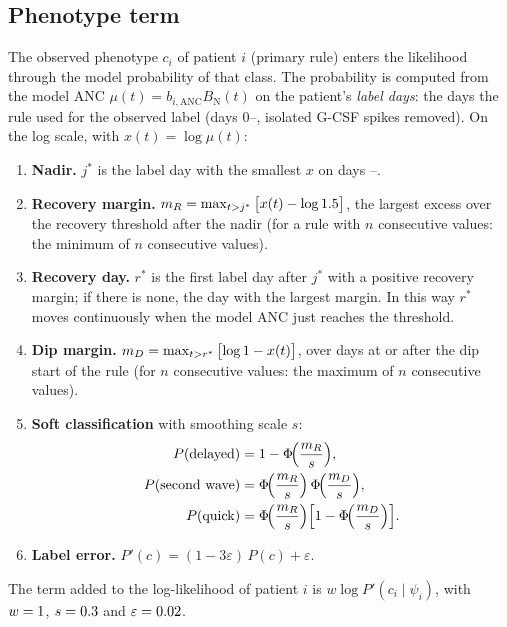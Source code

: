 \documentclass[11pt]{article}
\begin{document}
\subsection{Phenotype term}\label{sec:pheno}
The observed phenotype $c_i$ of patient $i$ (primary rule) enters the likelihood through the model probability of that class. The probability is computed from the model ANC $\mu(t)=b_{i,\mathrm{ANC}}B_{\mathrm{N}}(t)$ on the patient's \emph{label days}: the days the rule used for the observed label (days 0--\valPhWin, isolated G-CSF spikes removed). On the log scale, with $x(t)=\log\mu(t)$:
\begin{enumerate}
\item \textbf{Nadir.} $j^\ast$ is the label day with the smallest $x$ on days \valNadFrom--\valNadTo.
\item \textbf{Recovery margin.} $m_R=\max_{t>j^\ast}\,\bigl[x(t)-\log1.5\bigr]$, the largest excess over the recovery threshold after the nadir (for a rule with $n$ consecutive values: the minimum of $n$ consecutive values).
\item \textbf{Recovery day.} $r^\ast$ is the first label day after $j^\ast$ with a positive recovery margin; if there is none, the day with the largest margin. In this way $r^\ast$ moves continuously when the model ANC just reaches the threshold.
\item \textbf{Dip margin.} $m_D=\max_{t>r^\ast}\,\bigl[\log1-x(t)\bigr]$, over days at or after the dip start of the rule (for $n$ consecutive values: the maximum of $n$ consecutive values).
\item \textbf{Soft classification} with smoothing scale $s$:
\begin{equation}
\begin{aligned}
P(\mathrm{delayed}) &= 1-\Phi\!\Bigl(\frac{m_R}{s}\Bigr),\\
P(\mathrm{second\ wave}) &= \Phi\!\Bigl(\frac{m_R}{s}\Bigr)\,\Phi\!\Bigl(\frac{m_D}{s}\Bigr),\\
P(\mathrm{quick}) &= \Phi\!\Bigl(\frac{m_R}{s}\Bigr)\Bigl[1-\Phi\!\Bigl(\frac{m_D}{s}\Bigr)\Bigr].
\end{aligned} \label{eq:psoft}
\end{equation}
\item \textbf{Label error.} $P'(c)=(1-3\varepsilon)\,P(c)+\varepsilon$.
\end{enumerate}
The term added to the log-likelihood of patient $i$ is $w\log P'(c_i\mid\psi_i)$, with $w=1$, $s=0.3$ and $\varepsilon=0.02$.
\end{document}
